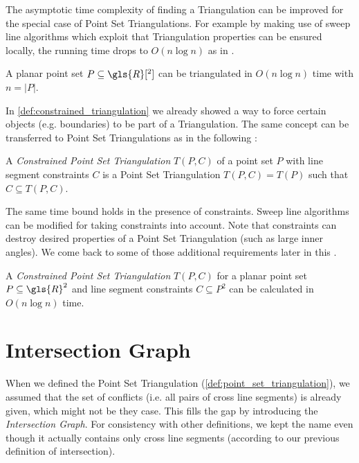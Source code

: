 The asymptotic time complexity of finding a Triangulation can be 
improved for the special case of Point Set Triangulations. For example
by making use of sweep line algorithms which exploit that
Triangulation properties can be ensured locally, the running time
drops to \(O(n \log n)\) as in \cite{fortunes_algorithm}.

\begin{theorem}
  \label{thm:time_complexity_planar_point_set_triangulations}
  A planar point set \(P \subseteq \gls{R}[^2]\) can be triangulated
  in \(O(n \log n)\) time with \(n = |P|\).
  \cite[Theorem 9.12]{deberg_compgeom}
\end{theorem}

In \cref{def:constrained_triangulation} we already showed a way to
force certain objects (e.g. boundaries) to be part of a Triangulation.
The same concept can be transferred to Point Set Triangulations as in
the following :

\begin{definition}
  \label{def:constrained_point_set_triangulation}
  A \emph{Constrained Point Set Triangulation} \(T(P,C)\)
  of a point set \(P\) with line segment constraints \(C\)
  is a Point Set Triangulation \(T(P,C) = T(P)\)
  such that \(C \subseteq T(P, C)\).
\end{definition}

The same time bound holds in the presence of constraints. Sweep line 
algorithms can be modified for taking constraints into account. Note
that constraints can destroy desired properties of a Point Set
Triangulation (such as large inner angles). We come back to some of
those additional requirements later in this
.

\begin{theorem}
  A \emph{Constrained Point Set Triangulation} \(T(P, C)\)
  for a planar point set \(P \subseteq \gls{R}^2\)
  and line segment constraints \(C \subseteq P^2\)
  can be calculated in \(O(n \log n)\) time.
  \cite{constrained_triangulation}
\end{theorem}

\section{Intersection Graph}
\label{sec:intersection_graph}
When we defined the Point Set Triangulation
(\cref{def:point_set_triangulation}), we assumed that the set of 
conflicts (i.e. all pairs of \gls{cross} line segments) is already
given, which might not be they case. This
 fills the gap by introducing the
\emph{Intersection Graph}. For consistency with other definitions, we
kept the name even though it actually contains only \gls{cross} line
segments (according to our previous definition of intersection).

